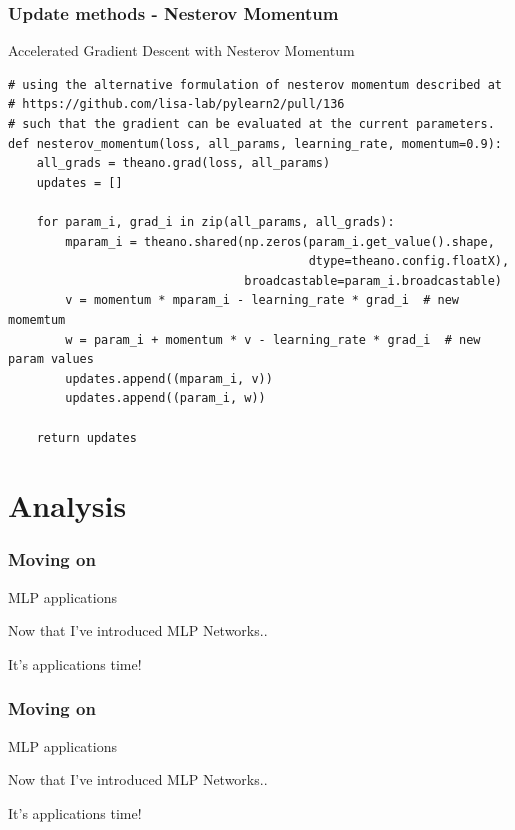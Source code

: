 \documentclass{beamer}
\begin{document}
\begin{frame}[fragile]
    \frametitle{Update methods - Nesterov Momentum}
    \begin{block}{Accelerated Gradient Descent with Nesterov Momentum}
    \begin{verbatim}
# using the alternative formulation of nesterov momentum described at
# https://github.com/lisa-lab/pylearn2/pull/136
# such that the gradient can be evaluated at the current parameters.
def nesterov_momentum(loss, all_params, learning_rate, momentum=0.9):
    all_grads = theano.grad(loss, all_params)
    updates = []

    for param_i, grad_i in zip(all_params, all_grads):
        mparam_i = theano.shared(np.zeros(param_i.get_value().shape,
                                          dtype=theano.config.floatX),
                                 broadcastable=param_i.broadcastable)
        v = momentum * mparam_i - learning_rate * grad_i  # new momemtum
        w = param_i + momentum * v - learning_rate * grad_i  # new param values
        updates.append((mparam_i, v))
        updates.append((param_i, w))

    return updates
\end{verbatim}
\end{block}
\end{frame}


\section{Analysis}


\begin{frame}
    \frametitle{Moving on}
    \begin{block}{MLP applications}
    \item Now that I've introduced MLP Networks..
    \item It's applications time!
    \end{block}
\end{frame}

\begin{frame}
    \frametitle{Moving on}
    \begin{block}{MLP applications}
    \item Now that I've introduced MLP Networks..
    \item It's applications time!
    \end{block}
\end{frame}
\end{document}
